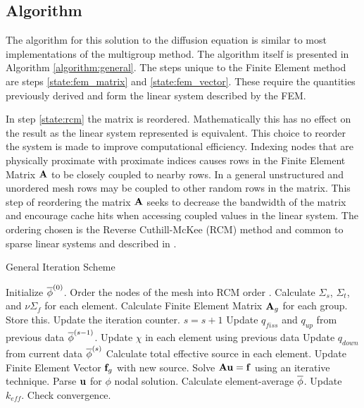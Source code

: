   \subsection{Algorithm}
    The algorithm for this solution to the diffusion equation is similar to most
    implementations of the multigroup method. The algorithm itself is presented 
    in Algorithm \ref{algorithm:general}. The steps unique to the Finite Element
    method are steps \ref{state:fem_matrix} and \ref{state:fem_vector}. These
    require the quantities previously derived and form the linear system 
    described by the FEM. 
    
    In step \ref{state:rcm} the matrix is reordered. Mathematically this has no
    effect on the result as the linear system represented is equivalent. This 
    choice to reorder the system is made to improve computational efficiency. 
    Indexing nodes that are physically proximate with proximate indices causes 
    rows in the Finite Element Matrix $\mathbf{A}$ to be closely coupled to nearby
    rows. In a general unstructured and unordered mesh rows may be coupled to 
    other random rows in the matrix. This step of reordering the matrix $\mathbf{A}$ 
    seeks to decrease the bandwidth of the matrix and encourage cache hits when
    accessing coupled values in the linear system. The ordering chosen is the
    Reverse Cuthill-McKee (RCM) method and common to sparse linear systems and 
    described in \cite{rcm}.
    
    \begin{algorithm}
      \caption{General Iteration Scheme}
      \label{algorithm:general}
      \begin{algorithmic}[1]
      \State Initialize $\overline{\phi}^{(0)}$.
      \State Order the nodes of the mesh into RCM order \cite{rcm}. 
        \label{state:rcm}
      \State Calculate $\Sigma_s$, $\Sigma_t$, and $\nu \Sigma_f$ for each 
        element.
      \State Calculate Finite Element Matrix $\mathbf{A}_g$ for each group. Store this. 
        \label{state:fem_matrix}
      	\State Update the iteration counter. $s=s+1$
      	\State Update $q_{fiss}$ and $q_{up}$ from previous data
          $\overline{\phi}^{(s-1)}$.
        \State Update $\chi$ in each element using previous data
          \State Update $q_{down}$ from current data $\overline{\phi}^{(s)}$
          \State Calculate total effective source in each element.
          \State Update Finite Element Vector $\mathbf{f}_g$ with new source.
            \label{state:fem_vector}
          \State Solve $\mathbf{A} \mathbf{u} = \mathbf{f}$ using an iterative technique.
          \State Parse $\mathbf{u}$ for $\phi$ nodal solution.
          \State Calculate element-average $\overline{\phi}$.
        \EndFor
        \State Update $k_{eff}$.
        \State Check convergence.
      \EndWhile
      \end{algorithmic}
    \end{algorithm}
    
